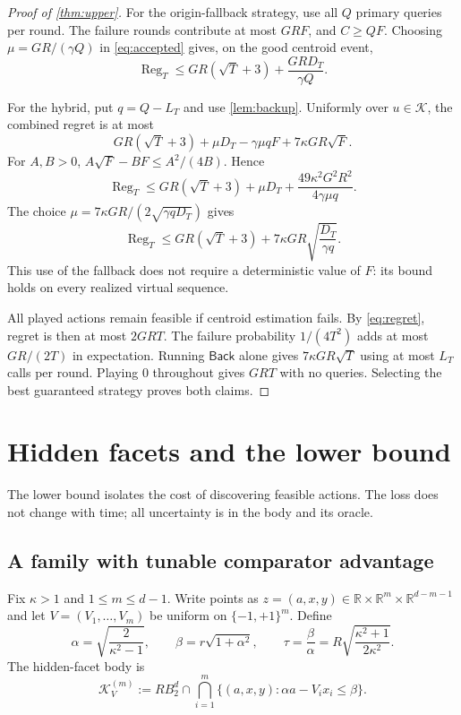 \documentclass[11pt]{article}
\newcommand{\R}{\mathbb R}
\newcommand{\K}{\mathcal K}
\newcommand{\Reg}{\operatorname{Reg}}
\newcommand{\Back}{\mathsf{Back}}
\theoremstyle{definition}
\begin{document}
\begin{proof}[Proof of \cref{thm:upper}]
For the origin-fallback strategy, use all $Q$ primary queries per round.
The failure rounds contribute at most $GRF$, and $C\ge QF$.
Choosing $\mu=GR/(\gamma Q)$ in \eqref{eq:accepted} gives, on the good
centroid event,
\begin{equation}\label{eq:origin-explicit}
 \Reg_T\le GR(\sqrt T+3)+\frac{GRD_T}{\gamma Q}.
\end{equation}

For the hybrid, put $q=Q-L_T$ and use \cref{lem:backup}. Uniformly over
$u\in\K$, the combined regret is at most
\[
 GR(\sqrt T+3)+\mu D_T-\gamma\mu qF+7\kappa GR\sqrt F.
\]
For $A,B>0$, $A\sqrt F-BF\le A^2/(4B)$. Hence
\[
 \Reg_T\le GR(\sqrt T+3)+\mu D_T
       +\frac{49\kappa^2G^2R^2}{4\gamma\mu q}.
\]
The choice
$\mu=7\kappa GR/(2\sqrt{\gamma qD_T})$ gives
\begin{equation}\label{eq:hybrid-explicit}
 \Reg_T\le GR(\sqrt T+3)
       +7\kappa GR\sqrt{\frac{D_T}{\gamma q}}.
\end{equation}
This use of the fallback does not require a deterministic value of $F$:
its bound holds on every realized virtual sequence.

All played actions remain feasible if centroid estimation fails. By
\eqref{eq:regret}, regret is then at most $2GRT$. The failure probability
$1/(4T^2)$ adds at most $GR/(2T)$ in expectation.
Running $\Back$ alone gives $7\kappa GR\sqrt T$ using at most $L_T$ calls
per round. Playing $0$ throughout gives $GRT$ with no queries.
Selecting the best guaranteed strategy proves both claims.
\end{proof}

\section{Hidden facets and the lower bound}\label{sec:lower}

The lower bound isolates the cost of discovering feasible actions. The loss
does not change with time; all uncertainty is in the body and its oracle.

\subsection{A family with tunable comparator advantage}

Fix $\kappa>1$ and $1\le m\le d-1$. Write points as
$z=(a,x,y)\in\R\times\R^m\times\R^{d-m-1}$ and let
$V=(V_1,\ldots,V_m)$ be uniform on $\{-1,+1\}^m$. Define
\begin{equation}\label{eq:facet-parameters}
 \alpha=\sqrt{\frac{2}{\kappa^2-1}},\qquad
 \beta=r\sqrt{1+\alpha^2},\qquad
 \tau=\frac{\beta}{\alpha}
 =R\sqrt{\frac{\kappa^2+1}{2\kappa^2}}.
\end{equation}
The hidden-facet body is
\begin{equation}\label{eq:body}
 \K_V^{(m)}:=RB_2^d\cap
 \bigcap_{i=1}^m\{(a,x,y):\alpha a-V_ix_i\le\beta\}.
\end{equation}
\end{document}
